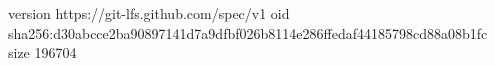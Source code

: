 version https://git-lfs.github.com/spec/v1
oid sha256:d30abcce2ba90897141d7a9dfbf026b8114e286ffedaf44185798cd88a08b1fc
size 196704
